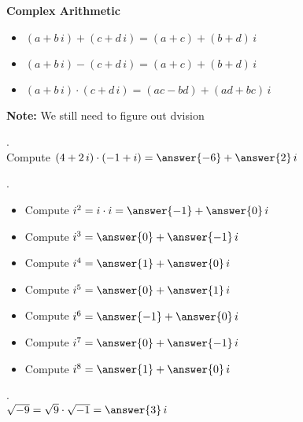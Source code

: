 \documentclass{ximera}
\begin{document}
\begin{definition}  \textbf{\textcolor{green!50!black}{Complex Arithmetic}} \\



\begin{itemize}
\item $ (a + b \, i) + (c + d \, i) = (a+c) + (b+d) \, i$
\item $ (a + b \, i) - (c + d \, i) = (a+c) + (b+d) \, i$
\item $ (a + b \, i) \cdot (c + d \, i) = (ac-bd) + (ad+bc) \, i$
\end{itemize}


\end{definition}









\textbf{Note:} We still need to figure out dvision






\begin{question}. \\

Compute   $(4 + 2 \, i) \cdot (-1 + i) = \answer{-6} + \answer{2} \, i$

\end{question}





\begin{question}. \\

\begin{itemize}
\item Compute   $i^2 = i \cdot i = \answer{-1} + \answer{0} \, i$
\item Compute   $i^3 =  \answer{0} + \answer{-1} \, i$
\item Compute   $i^4 =  \answer{1} + \answer{0} \, i$
\item Compute   $i^5 =  \answer{0} + \answer{1} \, i$
\item Compute   $i^6 =  \answer{-1} + \answer{0} \, i$
\item Compute   $i^7 =  \answer{0} + \answer{-1} \, i$
\item Compute   $i^8 =  \answer{1} + \answer{0} \, i$
\end{itemize}

\end{question}




\begin{question}. \\

$\sqrt{-9} = \sqrt{9} \cdot \sqrt{-1} =  \answer{3} \, i$

\end{question}
\end{document}
